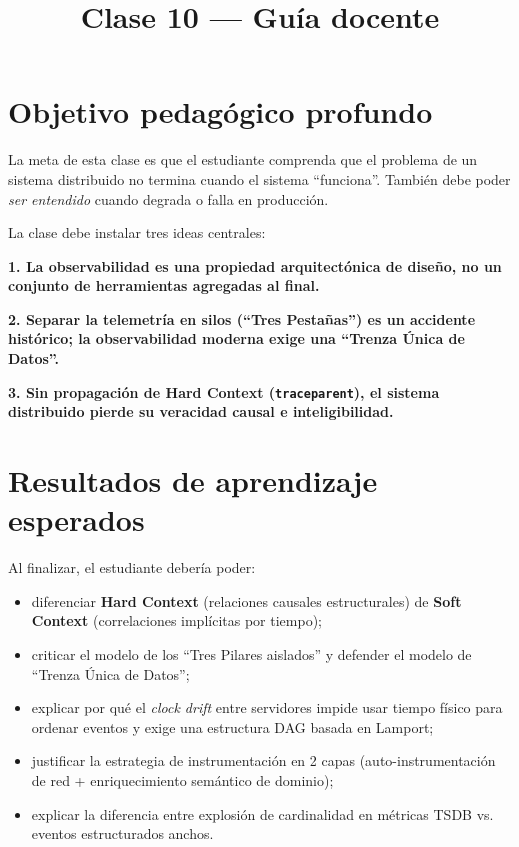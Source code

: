 \documentclass[variant=docente,cover=institutional,mode=screen]{ua-engineering-v6-article}
\title{Clase 10 --- Guía docente}
\author{\UAProfessor}
\date{\UADate}
\begin{document}
\maketitle

\section{Objetivo pedagógico profundo}

La meta de esta clase es que el estudiante comprenda que el problema de un sistema distribuido no termina cuando el sistema “funciona”. También debe poder \emph{ser entendido} cuando degrada o falla en producción.

La clase debe instalar tres ideas centrales:

\begin{center}
\textbf{1. La observabilidad es una propiedad arquitectónica de diseño, no un conjunto de herramientas agregadas al final.}
\end{center}

\begin{center}
\textbf{2. Separar la telemetría en silos (``Tres Pestañas'') es un accidente histórico; la observabilidad moderna exige una ``Trenza Única de Datos''.}
\end{center}

\begin{center}
\textbf{3. Sin propagación de Hard Context (\texttt{traceparent}), el sistema distribuido pierde su veracidad causal e inteligibilidad.}
\end{center}

\section{Resultados de aprendizaje esperados}

Al finalizar, el estudiante debería poder:

\begin{itemize}
\item diferenciar \textbf{Hard Context} (relaciones causales estructurales) de \textbf{Soft Context} (correlaciones implícitas por tiempo);
\item criticar el modelo de los ``Tres Pilares aislados'' y defender el modelo de ``Trenza Única de Datos'';
\item explicar por qué el \emph{clock drift} entre servidores impide usar tiempo físico para ordenar eventos y exige una estructura DAG basada en Lamport;
\item justificar la estrategia de instrumentación en 2 capas (auto-instrumentación de red + enriquecimiento semántico de dominio);
\item explicar la diferencia entre explosión de cardinalidad en métricas TSDB vs. eventos estructurados anchos.
\end{itemize}
\end{document}
